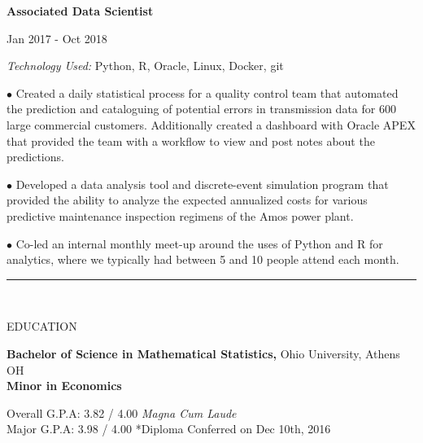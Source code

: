 \documentclass[12pt]{article}
\newcommand{\tab}[1][1cm]{\hspace*{#1}}
\newcommand{\header}[1]{
    \vspace*{-2mm}
    \rule{6.5in}{3pt} \\
    \smallskip
    \begin{large}
	    \textsc{\textcolor{lblue}{#1}}
    \end{large}
    \medskip
}
\newcommand{\position}[4]{
    \tab \textbf{#1} \hfill {\footnotesize #2 {-} #3 \par}
    \tab[1.25cm] \textit{Technology Used:} #4 \\
    \vspace*{0.5mm}
}
\newcommand{\bulletpoint}[1]{
  \hangindent=1.8cm \tab[1.3cm] $\bullet$#1 \\
  \vspace*{0.5mm}
}
\begin{document}
\begin{flushleft}
    \position{Associated Data Scientist}{Jan 2017}{Oct 2018}{Python, R, Oracle, Linux, Docker, git}
    \bulletpoint{
    	Created a daily statistical process for a quality control team that automated the prediction
	and cataloguing of potential errors in transmission data for 600 large commercial customers.
	Additionally created a dashboard with Oracle APEX that provided the team with a workflow
	to view and post notes about the predictions.
    }
    \bulletpoint{
    	Developed a data analysis tool and discrete-event simulation program that provided the
	ability to analyze the expected annualized costs for various predictive maintenance
	inspection regimens of the Amos power plant.
    }
    \bulletpoint{
    	Co-led an internal monthly meet-up around the uses of Python and R for analytics,
	where we typically had between 5 and 10 people attend each month.
   }
    \medskip
  \end{flushleft}

  \begin{flushleft}
    \header{EDUCATION}

    \textbf{Bachelor of Science in Mathematical Statistics,} \hfill Ohio University, Athens OH \\
    \textbf{Minor in Economics}

    \tab[0.5cm] Overall G.P.A:  3.82 / 4.00 \tab[0.25cm] \textit{Magna Cum Laude} \\
    \tab[0.5cm] \hspace*{2.08mm}Major G.P.A: 3.98 / 4.00  \hfill \small{*Diploma Conferred on Dec 10th, 2016}

    \smallskip
  \end{flushleft}
  
\end{document}
